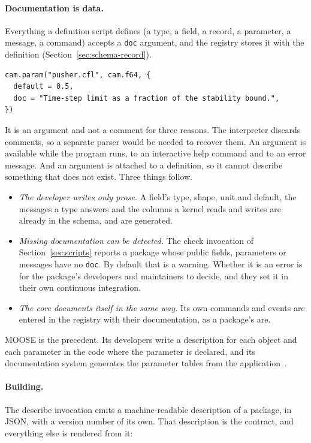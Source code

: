 \documentclass[11pt,a4paper]{article}
\newcommand{\code}[1]{\texttt{#1}}
\begin{document}
\paragraph{Documentation is data.}  Everything a definition script defines
(a type, a field, a record, a parameter, a message, a command) accepts a
\code{doc} argument, and the registry stores it with the definition
(Section~\ref{sec:schema-record}).

\begin{lstlisting}[language={[5.3]Lua}]
cam.param("pusher.cfl", cam.f64, {
  default = 0.5,
  doc = "Time-step limit as a fraction of the stability bound.",
})
\end{lstlisting}

It is an argument and not a comment for three reasons.  The interpreter
discards comments, so a separate parser would be needed to recover them.
An argument is available while the program runs, to an interactive help
command and to an error message.  And an argument is attached to a
definition, so it cannot describe something that does not exist.  Three
things follow.

\begin{itemize}
  \item \emph{The developer writes only prose.}  A field's type, shape, unit
        and default, the messages a type answers and the columns a kernel
        reads and writes are already in the schema, and are generated.
  \item \emph{Missing documentation can be detected.}  The check invocation
        of Section~\ref{sec:scripts} reports a package whose public fields,
        parameters or messages have no \code{doc}.  By default that is a
        warning.  Whether it is an error is for the package's developers and
        maintainers to decide, and they set it in their own continuous
        integration.
  \item \emph{The core documents itself in the same way.}  Its own commands
        and events are entered in the registry with their documentation,
        as a package's are.
\end{itemize}

MOOSE is the precedent.  Its developers write a description for each object
and each parameter in the code where the parameter is declared, and its
documentation system generates the parameter tables from the
application~\cite{moosedocs}.

\paragraph{Building.}  The describe invocation emits a machine-readable
description of a package, in JSON, with a version number of its own.  That
description is the contract, and everything else is rendered from it:
\end{document}
